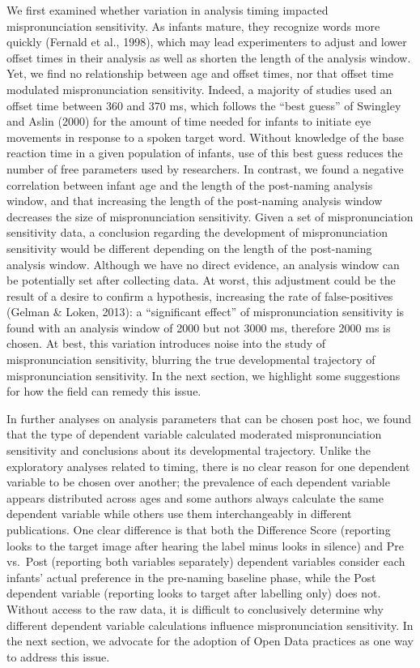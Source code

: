 \documentclass[man]{apa6}
\begin{document}
We first examined whether variation in analysis timing impacted mispronunciation sensitivity. As infants mature, they recognize words more quickly (Fernald et al., 1998), which may lead experimenters to adjust and lower offset times in their analysis as well as shorten the length of the analysis window. Yet, we find no relationship between age and offset times, nor that offset time modulated mispronunciation sensitivity. Indeed, a majority of studies used an offset time between 360 and 370 ms, which follows the \enquote{best guess} of Swingley and Aslin (2000) for the amount of time needed for infants to initiate eye movements in response to a spoken target word. Without knowledge of the base reaction time in a given population of infants, use of this best guess reduces the number of free parameters used by researchers. In contrast, we found a negative correlation between infant age and the length of the post-naming analysis window, and that increasing the length of the post-naming analysis window decreases the size of mispronunciation sensitivity. Given a set of mispronunciation sensitivity data, a conclusion regarding the development of mispronunciation sensitivity would be different depending on the length of the post-naming analysis window. Although we have no direct evidence, an analysis window can be potentially set after collecting data. At worst, this adjustment could be the result of a desire to confirm a hypothesis, increasing the rate of false-positives (Gelman \& Loken, 2013): a \enquote{significant effect} of mispronunciation sensitivity is found with an analysis window of 2000 but not 3000 ms, therefore 2000 ms is chosen. At best, this variation introduces noise into the study of mispronunciation sensitivity, blurring the true developmental trajectory of mispronunciation sensitivity. In the next section, we highlight some suggestions for how the field can remedy this issue.

In further analyses on analysis parameters that can be chosen post hoc, we found that the type of dependent variable calculated moderated mispronunciation sensitivity and conclusions about its developmental trajectory. Unlike the exploratory analyses related to timing, there is no clear reason for one dependent variable to be chosen over another; the prevalence of each dependent variable appears distributed across ages and some authors always calculate the same dependent variable while others use them interchangeably in different publications. One clear difference is that both the Difference Score (reporting looks to the target image after hearing the label minus looks in silence) and Pre vs.~Post (reporting both variables separately) dependent variables consider each infants' actual preference in the pre-naming baseline phase, while the Post dependent variable (reporting looks to target after labelling only) does not. Without access to the raw data, it is difficult to conclusively determine why different dependent variable calculations influence mispronunciation sensitivity. In the next section, we advocate for the adoption of Open Data practices as one way to address this issue.
\end{document}
